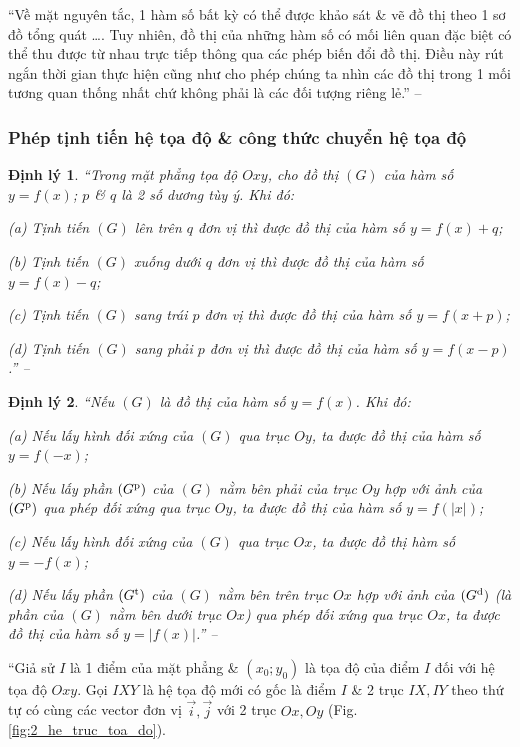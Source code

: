 \documentclass{article}
\numberwithin{equation}{section}
\newtheorem{dinhly}{Định lý}[section]
\begin{document}
``Về mặt nguyên tắc, 1 hàm số bất kỳ có thể được khảo sát \& vẽ đồ thị theo 1 sơ đồ tổng quát \ldots. Tuy nhiên, đồ thị của những hàm số có mối liên quan đặc biệt có thể thu được từ nhau trực tiếp thông qua các phép biến đổi đồ thị. Điều này rút ngắn thời gian thực hiện cũng như cho phép chúng ta nhìn các đồ thị trong 1 mối tương quan thống nhất chứ không phải là các đối tượng riêng lẻ.'' -- \cite[p. 5]{TL_chuyen_Toan_Giai_Tich_12}

\subsubsection{Phép tịnh tiến hệ tọa độ \& công thức chuyển hệ tọa độ}

\begin{dinhly}
	``Trong mặt phẳng tọa độ $Oxy$, cho đồ thị $(G)$ của hàm số $y = f(x)$; $p$ \& $q$ là 2 số dương tùy ý. Khi đó:
	\begin{enumerate*}
		\item[(a)] Tịnh tiến $(G)$ lên trên $q$ đơn vị thì được đồ thị của hàm số $y = f(x) + q$;
		\item[(b)] Tịnh tiến $(G)$ xuống dưới $q$ đơn vị thì được đồ thị của hàm số $y = f(x) - q$;
		\item[(c)] Tịnh tiến $(G)$ sang trái $p$ đơn vị thì được đồ thị của hàm số $y = f(x + p)$;
		\item[(d)] Tịnh tiến $(G)$ sang phải $p$ đơn vị thì được đồ thị của hàm số $y = f(x - p)$.'' -- \cite[p. 6]{TL_chuyen_Toan_Giai_Tich_12}
	\end{enumerate*}
\end{dinhly}

\begin{dinhly}
	``Nếu $(G)$ là đồ thị của hàm số $y = f(x)$. Khi đó:
	\begin{enumerate*}
		\item[(a)] Nếu lấy hình đối xứng của $(G)$ qua trục $Oy$, ta được đồ thị của hàm số $y = f(-x)$;
		\item[(b)] Nếu lấy phần $(G^{\rm p})$ của $(G)$ nằm bên phải của trục $Oy$ hợp với ảnh của $(G^{\rm p})$ qua phép đối xứng qua trục $Oy$, ta được đồ thị của hàm số $y = f(|x|)$;
		\item[(c)] Nếu lấy hình đối xứng của $(G)$ qua trục $Ox$, ta được đồ thị hàm số $y = -f(x)$;
		\item[(d)] Nếu lấy phần $(G^{\rm t})$ của $(G)$ nằm bên trên trục $Ox$ hợp với ảnh của $(G^{\rm d})$ (là phần của $(G)$ nằm bên dưới trục $Ox$) qua phép đối xứng qua trục $Ox$, ta được đồ thị của hàm số $y = |f(x)|$.'' -- \cite[p. 6]{TL_chuyen_Toan_Giai_Tich_12}
	\end{enumerate*}
\end{dinhly}
``Giả sử $I$ là 1 điểm của mặt phẳng \& $(x_0;y_0)$ là tọa độ của điểm $I$ đối với hệ tọa độ $Oxy$. Gọi $IXY$ là hệ tọa độ mới có gốc là điểm $I$ \& 2 trục $IX,IY$ theo thứ tự có cùng các vector đơn vị $\vec{i},\vec{j}$ với 2 trục $Ox,Oy$ (Fig. \ref{fig:2_he_truc_toa_do}).
\end{document}
